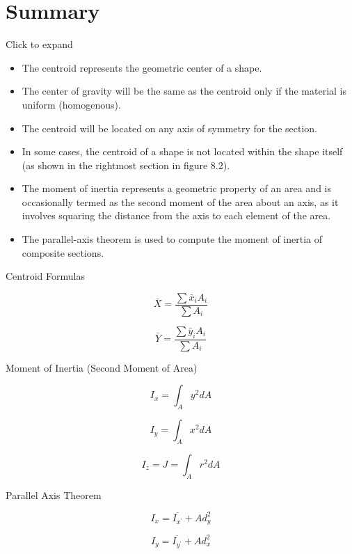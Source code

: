\documentclass[
  letterpaper,
  DIV=11,
  numbers=noendperiod]{scrreprt}
\theoremstyle{definition}
\theoremstyle{remark}
\begin{document}
\section*{Summary}\label{summary-7}


Click to expand

\begin{tcolorbox}[enhanced jigsaw, leftrule=.75mm, colbacktitle=quarto-callout-note-color!10!white, breakable, opacityback=0, colback=white, titlerule=0mm, toprule=.15mm, colframe=quarto-callout-note-color-frame, coltitle=black, title={Key Takeaways}, toptitle=1mm, bottomrule=.15mm, rightrule=.15mm, left=2mm, arc=.35mm, opacitybacktitle=0.6, bottomtitle=1mm]

\begin{itemize}
\item
  The centroid represents the geometric center of a shape.
\item
  The center of gravity will be the same as the centroid only if the
  material is uniform (homogenous).
\item
  The centroid will be located on any axis of symmetry for the section.
\item
  In some cases, the centroid of a shape is not located within the shape
  itself (as shown in the rightmost section in figure 8.2).
\item
  The moment of inertia represents a geometric property of an area and
  is occasionally termed as the second moment of the area about an axis,
  as it involves squaring the distance from the axis to each element of
  the area.
\item
  The parallel-axis theorem is used to compute the moment of inertia of
  composite sections.
\end{itemize}

\end{tcolorbox}

\begin{tcolorbox}[enhanced jigsaw, leftrule=.75mm, colbacktitle=quarto-callout-note-color!10!white, breakable, opacityback=0, colback=white, titlerule=0mm, toprule=.15mm, colframe=quarto-callout-note-color-frame, coltitle=black, title={Key Equations}, toptitle=1mm, bottomrule=.15mm, rightrule=.15mm, left=2mm, arc=.35mm, opacitybacktitle=0.6, bottomtitle=1mm]

Centroid Formulas

\[
\bar{X}=\frac{\sum \bar{x}_i A_i}{\sum A_i}
\]

\[
\bar{Y}=\frac{\sum \bar{y}_i A_i}{\sum A_i}
\]

Moment of Inertia (Second Moment of Area)

\[
I_x=\int_A y^2 d A
\]

\[
I_y=\int_A x^2 d A
\]

\[
I_z=J=\int_A r^2 d A
\]

Parallel Axis Theorem

\[
I_x=\overline{I_{x^{\prime}}}+A d_y^2
\]

\[
I_y=\overline{I_{y^{\prime}}}+A d_x^2
\]

\end{tcolorbox}
\end{document}

